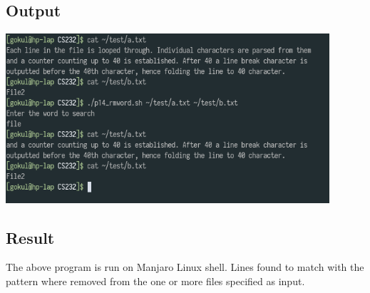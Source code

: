 \documentclass{article}
\begin{document}
\subsection{Output}
\includegraphics[width=0.9\textwidth]{img/p18.png}\newline

\subsection{Result}
The above program is run on Manjaro Linux shell. Lines found to match with the
pattern where removed from the one or more files specified as input.
\end{document}
